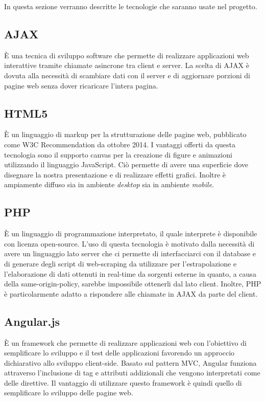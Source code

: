 In questa sezione verranno descritte le tecnologie che saranno usate nel progetto.

\subsection{AJAX}
È una tecnica di sviluppo software che permette di realizzare applicazioni web interattive tramite chiamate asincrone tra client e server.
La scelta di AJAX è dovuta alla necessità di scambiare dati con il server e di aggiornare porzioni di pagine web senza dover ricaricare l'intera pagina.

\subsection{HTML5}
È un linguaggio di markup per la strutturazione delle pagine web, pubblicato come W3C Recommendation da ottobre 2014.
I vantaggi offerti da questa tecnologia sono il supporto canvas per la creazione di figure e animazioni utilizzando il linguaggio JavaScript. Ciò permette di avere una superficie dove disegnare la nostra presentazione e di realizzare effetti grafici. Inoltre è ampiamente diffuso sia in ambiente \textit{desktop} sia in ambiente \textit{mobile}.

\subsection{PHP}
È un linguaggio di programmazione interpretato, il quale interprete è disponibile con licenza open-source.
L'uso di questa tecnologia è motivato dalla necessità di avere un linguaggio lato server che ci permette di interfacciarci con il database e di generare degli script di web-scraping da utilizzare per l'estrapolazione e l'elaborazione di dati ottenuti in real-time da sorgenti esterne in quanto, a causa della same-origin-policy, sarebbe impossibile ottenerli dal lato client. Inoltre, PHP è particolarmente adatto a rispondere alle chiamate in AJAX da parte del client.

\subsection{Angular.js}
È un framework che permette di realizzare applicazioni web con l'obiettivo di semplificare lo sviluppo e il test delle applicazioni favorendo un approccio dichiarativo allo sviluppo client-side. Basato sul pattern MVC, Angular funziona attraverso l'inclusione di tag e attributi addizionali che vengono interpretati come delle direttive.
Il vantaggio di utilizzare questo framework è quindi quello di semplificare lo sviluppo delle pagine web.

